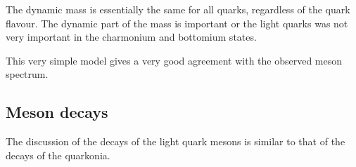 \documentclass[12pt]{article}
\begin{document}
The dynamic mass is essentially the same for all quarks, regardless of the quark flavour. The dynamic part of the mass is important or the light quarks was not very important in the charmonium and bottomium states.   

This very simple model gives a very good agreement with the observed meson spectrum.
\subsection{Meson decays}
The discussion of the decays of the light quark mesons is similar to that of the decays of the quarkonia.
\end{document}
